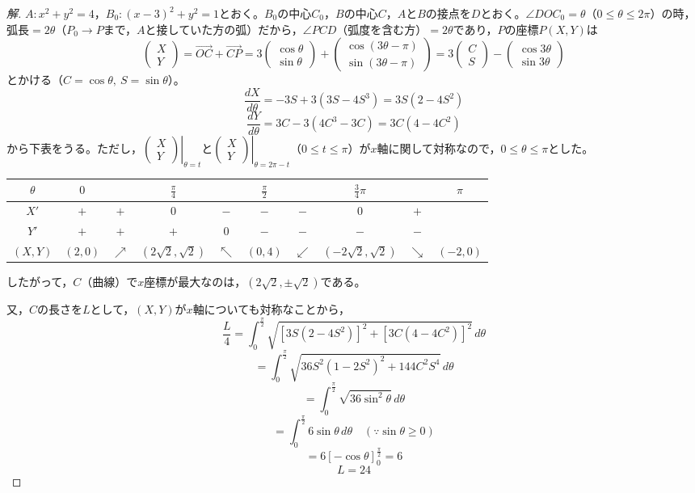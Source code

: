 \documentclass[../main.tex]{subfiles}
\begin{document}
\begin{proof}[解]
  $A: x^2+y^2=4$，$B_0: (x-3)^2+y^2=1$とおく。$B_0$の中心$C_0$，$B$の中心$C$，$A$と$B$の接点を$D$とおく。$\angle DOC_0=\theta$（$0\le\theta\le2\pi$）の時，弧長$=2\theta$（$P_0\to P$まで，$A$と接していた方の弧）だから，$\angle PCD$（弧度を含む方）$=2\theta$であり，$P$の座標$P(X,Y)$は
  \[
    \begin{pmatrix}X\\Y
    \end{pmatrix}=\overrightarrow{OC}+\overrightarrow{CP}=3
    \begin{pmatrix}\cos\theta\\\sin\theta
    \end{pmatrix}+
    \begin{pmatrix}\cos(3\theta-\pi)\\\sin(3\theta-\pi)
    \end{pmatrix}=3
    \begin{pmatrix}C\\S
    \end{pmatrix}-
    \begin{pmatrix}\cos3\theta\\\sin3\theta
    \end{pmatrix}
  \]
  とかける（$C=\cos\theta,\ S=\sin\theta$）。
  \[
    \frac{dX}{d\theta}=-3S+3(3S-4S^3)=3S(2-4S^2)
  \]
  \[
    \frac{dY}{d\theta}=3C-3(4C^3-3C)=3C(4-4C^2)
  \]
  から下表をうる。ただし，$\left.
  \begin{pmatrix}X\\Y
  \end{pmatrix}\right|_{\theta=t}$と$\left.
  \begin{pmatrix}X\\Y
  \end{pmatrix}\right|_{\theta=2\pi-t}$（$0\le t\le\pi$）が$x$軸に関して対称なので，$0\le\theta\le\pi$とした。
  \begin{center}
    \begin{tabular}{c|ccccccccc}
      $\theta$ & $0$ & & $\frac{\pi}{4}$ & & $\frac{\pi}{2}$ & & $\frac{3}{4}\pi$ & & $\pi$ \\
      \hline
      $X'$ & $+$ & $+$ & $0$ & $-$ & $-$ & $-$ & $0$ & $+$ & \\
      \hline
      $Y'$ & $+$ & $+$ & $+$ & $0$ & $-$ & $-$ & $-$ & $-$ & \\
      \hline
      $(X,Y)$ & $(2,0)$ & $\nearrow$ & $(2\sqrt2,\sqrt2)$ & $\nwarrow$ & $(0,4)$ & $\swarrow$ & $(-2\sqrt2,\sqrt2)$ & $\searrow$ & $(-2,0)$
    \end{tabular}
  \end{center}
  したがって，$C$（曲線）で$x$座標が最大なのは，$(2\sqrt2,\pm\sqrt2)$である。

  又，$C$の長さを$L$として，$(X,Y)$が$x$軸についても対称なことから，
  \[
    \frac{L}{4}=\int_0^{\frac{\pi}{2}}\sqrt{\left[3S(2-4S^2)\right]^2+\left[3C(4-4C^2)\right]^2}\,d\theta
  \]
  \[
    =\int_0^{\frac{\pi}{2}}\sqrt{36S^2(1-2S^2)^2+144C^2S^4}\,d\theta
  \]
  \[
    =\int_0^{\frac{\pi}{2}}\sqrt{36\sin^2\theta}\,d\theta
  \]
  \[
    =\int_0^{\frac{\pi}{2}}6\sin\theta\,d\theta \quad(\because\sin\theta\ge0)
  \]
  \[
    =6\left[-\cos\theta\right]_0^{\frac{\pi}{2}}=6
  \]
  \[
    L=24
  \]
\end{proof}
\end{document}
